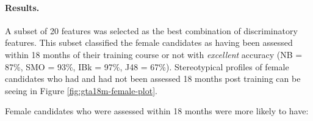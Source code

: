 \documentclass[
  12pt,
  a4paper,
]{book}
\begin{document}
\hypertarget{mts-part-b-female-gta-results}{%
\paragraph{Results.}\label{mts-part-b-female-gta-results}}

A subset of 20 features was selected as the best combination of discriminatory features. This subset classified the female candidates as having been assessed within 18 months of their training course or not with \emph{excellent} accuracy (NB = 87\%, SMO = 93\%, IBk = 97\%, J48 = 67\%). Stereotypical profiles of female candidates who had and had not been assessed 18 months post training can be seeing in Figure \ref{fig:gta18m-female-plot}.

Female candidates who were assessed within 18 months were more likely to have:
\end{document}

